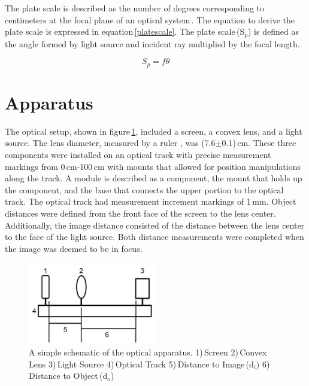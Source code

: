 \documentclass[twocolumn]{aastex6}
\begin{document}
The plate scale is described as the number of degrees corresponding to centimeters at the focal plane of an optical system\,\cite{5}. The equation to derive the plate scale is expressed in equation\,\ref{platescale}. The plate scale\,(S$_p$) is defined as the angle formed by light source and incident ray multiplied by the focal length.

\begin{equation}
S_p = f\theta
\label{platescale}
\end{equation}



\section{Apparatus}


The optical setup, shown in figure\,\ref{apparatus}, included a screen, a convex lens, and a light source. The lens diameter, measured by a ruler , was (7.6$\pm$0.1)\,cm. These three components were installed on an optical track with precise measurement markings from 0\,cm-100\,cm with mounts that allowed for position manipulations along the track. A module is described as a component, the mount that holds up the component, and the base that connects the upper portion to the optical track. The optical track had measurement increment markings of 1\,mm. Object distances were defined from the front face of the screen to the lens center. Additionally, the image distance consisted of the distance between the lens center to the face of the light source. Both distance measurements were completed when the image was deemed to be in focus.


\begin{figure}[h]
  \centering
    \includegraphics[width=0.5\textwidth]{apparatusclip.png}
      \caption{A simple schematic of the optical apparatus. 1)\,Screen 2)\,Convex Lens 3)\,Light Source 4)\,Optical Track 5)\,Distance to Image\,(d$_{i}$) 6)\,Distance to Object\,(d$_{o}$)}
      \label{apparatus}
\end{figure}
\end{document}
